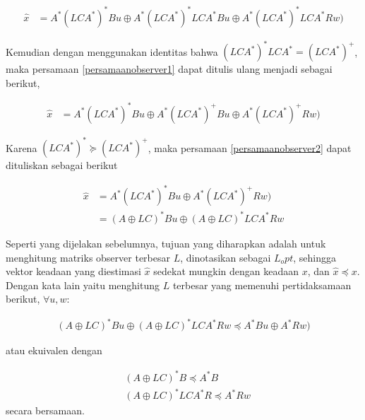 \begin{equation}
	\begin{aligned}	
		\hat{x} &= A^* (LCA^*)^* Bu \oplus A^* (LCA^*)^* LCA^* Bu\oplus A^* (LCA^*)^* LCA^* Rw)
	\end{aligned} \label{persamaanobserver1}
\end{equation}

Kemudian dengan menggunakan identitas bahwa $ (LCA^*)^* LCA^* = (LCA^*)^+ $, maka persamaan \ref{persamaanobserver1} dapat ditulis ulang menjadi sebagai berikut,

\begin{equation}
	\begin{aligned}	
		\hat{x} &= A^* (LCA^*)^* Bu \oplus A^* (LCA^*)^+ Bu\oplus A^* (LCA^*)^+ Rw)
	\end{aligned} \label{persamaanobserver2}
\end{equation}

Karena $ (LCA^*)^* \succeq (LCA^*)^+ $, maka persamaan \ref{persamaanobserver2} dapat dituliskan sebagai berikut

\begin{equation}
	\begin{aligned}	
		\hat{x} &= A^* (LCA^*)^* Bu \oplus A^* (LCA^*)^+ Rw) \\
		&= (A\oplus LC)^* Bu \oplus (A\oplus LC)^* LCA^* Rw
	\end{aligned} \label{persamaanobserver3}
\end{equation}

Seperti yang dijelakan sebelumnya, tujuan yang diharapkan adalah untuk menghitung matriks observer terbesar $ L $, dinotasikan sebagai $ L_opt  $, sehingga vektor keadaan yang diestimasi $ \hat{x} $ sedekat mungkin dengan keadaan $ x $, dan $ \hat{x} \preceq x $. Dengan kata lain yaitu menghitung $ L $ terbesar yang memenuhi pertidaksamaan berikut, $ \forall u,w $:

\begin{equation}
	\begin{aligned}	
		(A\oplus LC)^* Bu \oplus (A\oplus LC)^* LCA^* Rw \preceq A^* Bu \oplus A^*Rw) 
	\end{aligned} \label{persamaanobserver4}
\end{equation}

atau ekuivalen dengan

\begin{equation}
\begin{aligned}	
	& (A\oplus LC)^* B \preceq A^* B \\
	& (A\oplus LC)^* LCA^* R \preceq A^*Rw
\end{aligned} \label{persamaanobserver5}
\end{equation}
secara bersamaan.

